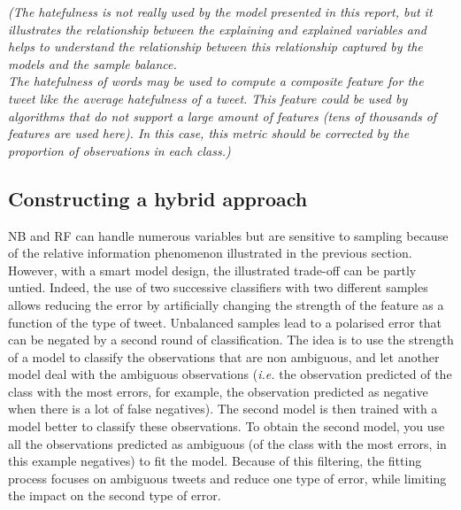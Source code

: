 \documentclass[a4paper]{tufte-handout}
\begin{document}
\begin{fullwidth}
\textit{(The hatefulness is not really used by the model presented in this report, but it illustrates the relationship between the explaining and explained variables and helps to understand the relationship between this relationship captured by the models and the sample balance.\\
The hatefulness of words may be used to compute a composite feature for the tweet like the average hatefulness of a tweet. This feature could be used by algorithms that do not support a large amount of features (tens of thousands of features are used here). In this case, this metric should be corrected by the proportion of observations in each class.)}

\subsection{Constructing a hybrid approach}

NB and RF can handle numerous variables but are sensitive to sampling because of the relative information phenomenon illustrated in the previous section. However, with a smart model design, the illustrated trade-off can be partly untied. Indeed, the use of two successive classifiers with two different samples allows reducing the error by artificially changing the strength of the feature as a function of the type of tweet. Unbalanced samples lead to a polarised error that can be negated by a second round of classification. The idea is to use the strength of a model to classify the observations that are non ambiguous, and let another model deal with the ambiguous observations (\textit{i.e.} the observation predicted of the class with the most errors, for example, the observation predicted as negative when there is a lot of false negatives). The second model is then trained with a model better to classify these observations. To obtain the second model, you use all the observations predicted as ambiguous (of the class with the most errors, in this example negatives) to fit the model. Because of this filtering, the fitting process focuses on ambiguous tweets and reduce one type of error, while limiting the impact on the second type of error.


\end{fullwidth}
\end{document}
